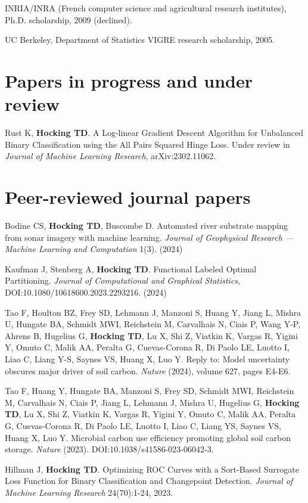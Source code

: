 \documentclass[margin,line]{res}
\begin{document}
\begin{resume}
INRIA/INRA (French computer science and agricultural research institutes), Ph.D. scholarship, 2009 (declined).

UC Berkeley, Department of Statistics VIGRE research scholarship, 2005.

\section{\sc Papers in progress and under review}

Rust K, {\bf Hocking TD}. A Log-linear Gradient Descent Algorithm for
Unbalanced Binary Classification using the All Pairs Squared Hinge
Loss. Under review in {\it Journal of Machine Learning Research},
arXiv:2302.11062.

\section{\sc Peer-reviewed journal papers}

Bodine CS, {\bf Hocking TD}, Buscombe D. Automated river substrate
mapping from sonar imagery with machine learning.  {\it
  Journal of Geophysical Research --- Machine Learning and
  Computation} 1(3). (2024)

Kaufman J, Stenberg A, {\bf Hocking TD}. Functional Labeled Optimal
Partitioning. {\it Journal of Computational and Graphical Statistics},
DOI:10.1080/10618600.2023.2293216. (2024)

Tao F, Houlton BZ, Frey SD, Lehmann J, Manzoni S, Huang Y, Jiang L,
Mishra U, Hungate BA, Schmidt MWI, Reichstein M, Carvalhais N, Ciais
P, Wang Y-P, Ahrens B, Hugelius G, {\bf Hocking TD}, Lu X, Shi Z, Viatkin K,
Vargas R, Yigini Y, Omuto C, Malik AA, Peralta G, Cuevas-Corona R, Di
Paolo LE, Luotto I, Liao C, Liang Y-S, Saynes VS, Huang X, Luo
Y. Reply to: Model uncertainty obscures major driver of soil
carbon. {\it Nature} (2024), volume 627, pages E4-E6.

Tao F, Huang Y, Hungate BA, Manzoni S, Frey SD, Schmidt MWI,
Reichstein M, Carvalhais N, Ciais P, Jiang L, Lehmann J, Mishra U,
Hugelius G, {\bf Hocking TD}, Lu X, Shi Z, Viatkin K, Vargas R, Yigini
Y, Omuto C, Malik AA, Peralta G, Cuevas-Corona R, Di Paolo LE, Luotto
I, Liao C, Liang YS, Saynes VS, Huang X, Luo Y. Microbial carbon use
efficiency promoting global soil carbon storage. {\it Nature} (2023).
DOI:10.1038/s41586-023-06042-3.

Hillman J, {\bf Hocking TD}. Optimizing ROC Curves with a Sort-Based
Surrogate Loss Function for Binary Classification and Changepoint
Detection. {\it Journal of Machine Learning Research} 24(70):1-24, 2023.


\end{resume}
\end{document}
